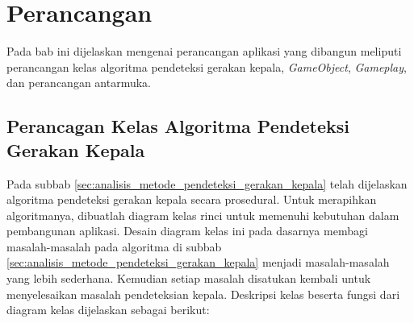 \chapter{Perancangan}
\label{chap:perancangan}


Pada bab ini dijelaskan mengenai perancangan aplikasi yang dibangun meliputi perancangan kelas algoritma pendeteksi gerakan kepala, \textit{GameObject},  \textit{Gameplay}, dan perancangan antarmuka.

\section{Perancagan Kelas Algoritma Pendeteksi Gerakan Kepala}
\label{sec:perancangan_kelas_algoritma_Pendeteksi_Gerakan_Kepala}

Pada subbab \ref{sec:analisis_metode_pendeteksi_gerakan_kepala} telah dijelaskan algoritma pendeteksi gerakan kepala secara prosedural. Untuk merapihkan algoritmanya, dibuatlah diagram kelas rinci untuk memenuhi kebutuhan dalam pembangunan aplikasi. Desain diagram kelas ini pada dasarnya membagi  masalah-masalah pada algoritma di subbab \ref{sec:analisis_metode_pendeteksi_gerakan_kepala} menjadi masalah-masalah yang lebih sederhana. Kemudian setiap masalah disatukan kembali untuk menyelesaikan masalah pendeteksian kepala. Deskripsi kelas beserta fungsi dari diagram kelas dijelaskan sebagai berikut:


